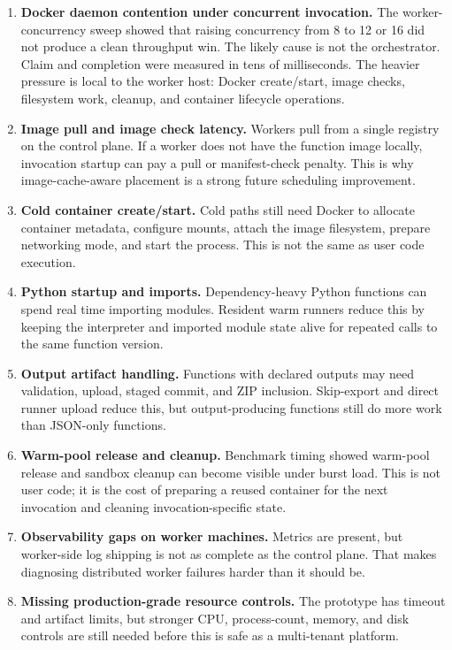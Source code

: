 \documentclass[12pt,a4paper]{report}
\begin{document}
\begin{enumerate}[leftmargin=1.2cm]
  \item \textbf{Docker daemon contention under concurrent invocation.} The worker-concurrency sweep showed that raising concurrency from 8 to 12 or 16 did not produce a clean throughput win. The likely cause is not the orchestrator. Claim and completion were measured in tens of milliseconds. The heavier pressure is local to the worker host: Docker create/start, image checks, filesystem work, cleanup, and container lifecycle operations.
  \item \textbf{Image pull and image check latency.} Workers pull from a single registry on the control plane. If a worker does not have the function image locally, invocation startup can pay a pull or manifest-check penalty. This is why image-cache-aware placement is a strong future scheduling improvement.
  \item \textbf{Cold container create/start.} Cold paths still need Docker to allocate container metadata, configure mounts, attach the image filesystem, prepare networking mode, and start the process. This is not the same as user code execution.
  \item \textbf{Python startup and imports.} Dependency-heavy Python functions can spend real time importing modules. Resident warm runners reduce this by keeping the interpreter and imported module state alive for repeated calls to the same function version.
  \item \textbf{Output artifact handling.} Functions with declared outputs may need validation, upload, staged commit, and ZIP inclusion. Skip-export and direct runner upload reduce this, but output-producing functions still do more work than JSON-only functions.
  \item \textbf{Warm-pool release and cleanup.} Benchmark timing showed warm-pool release and sandbox cleanup can become visible under burst load. This is not user code; it is the cost of preparing a reused container for the next invocation and cleaning invocation-specific state.
  \item \textbf{Observability gaps on worker machines.} Metrics are present, but worker-side log shipping is not as complete as the control plane. That makes diagnosing distributed worker failures harder than it should be.
  \item \textbf{Missing production-grade resource controls.} The prototype has timeout and artifact limits, but stronger CPU, process-count, memory, and disk controls are still needed before this is safe as a multi-tenant platform.
\end{enumerate}
\end{document}
